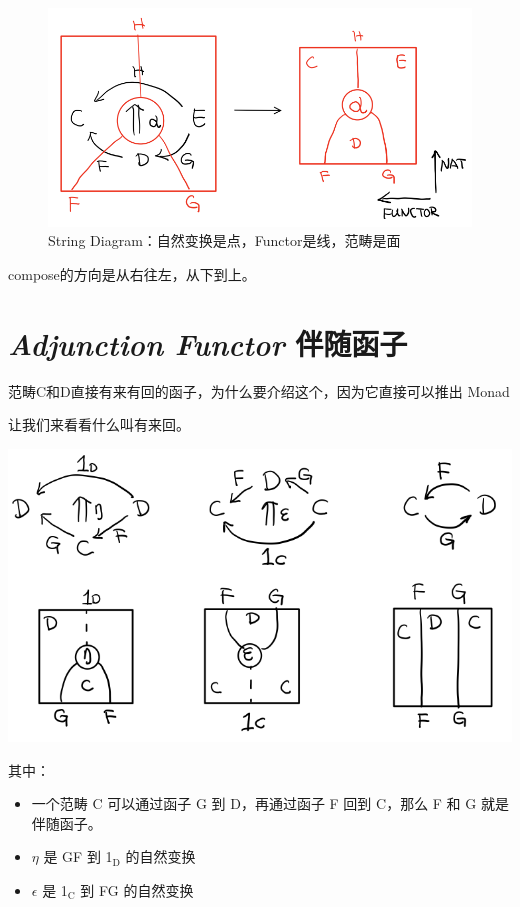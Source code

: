 \documentclass[11pt]{tufte-book}
\begin{document}
\begin{figure}[htbp]
\centering
\includegraphics[width=.9\linewidth]{images/p1-string-diagram.png}
\caption{String Diagram：自然变换是点，Functor是线，范畴是面}
\end{figure}

compose的方向是从右往左，从下到上。

\chapter{\emph{Adjunction Functor} 伴随函子}
\label{sec:org7e0062a}
范畴C和D直接有来有回的函子，为什么要介绍这个，因为它直接可以推出 Monad

让我们来看看什么叫有来回。

\begin{center}
\includegraphics[width=.9\linewidth]{images/p1-adjunction-functor.png}
\end{center}

其中：

\begin{itemize}
\item 一个范畴 C 可以通过函子 G 到 D，再通过函子 F 回到 C，那么 F 和 G 就是伴随函子。
\item \(\eta\) 是 GF 到 1\(_{\text{D}}\) 的自然变换
\item \(\epsilon\) 是 1\(_{\text{C}}\) 到 FG 的自然变换
\end{itemize}
\end{document}
